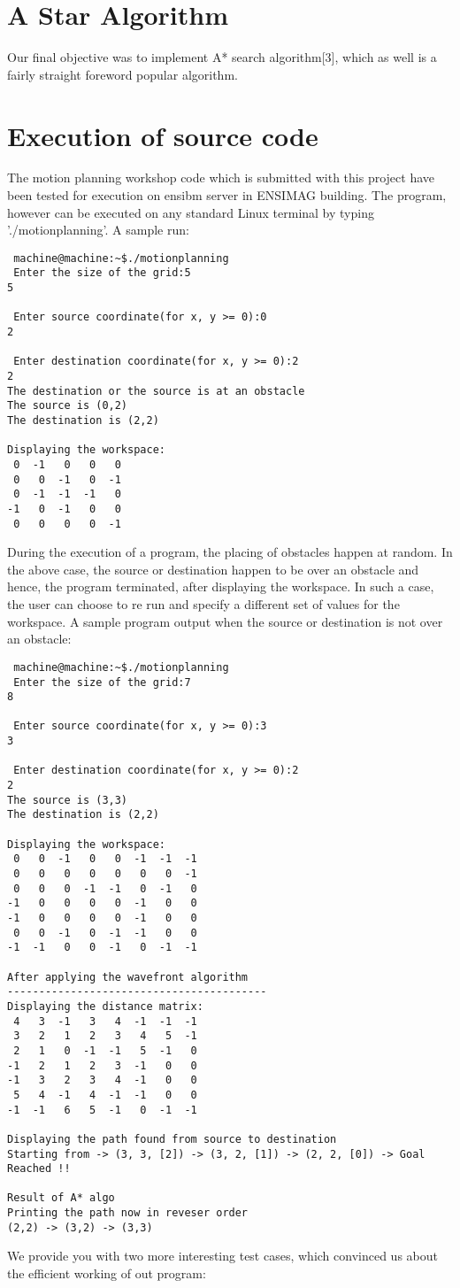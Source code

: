 \documentclass{report}
\begin{document}
\section{A Star Algorithm}
	Our final objective was to implement A* search algorithm[3], which as well is a fairly straight foreword popular algorithm.
	
\section{Execution of source code}

	The motion planning workshop code which is submitted with this project have been tested for execution on \textsf{ensibm} server in ENSIMAG building. The program, however can be executed on any standard Linux terminal by typing \textsf{'./motionplanning'}. A sample run:
	\begin{verbatim}
 machine@machine:~$./motionplanning
 Enter the size of the grid:5
5

 Enter source coordinate(for x, y >= 0):0
2

 Enter destination coordinate(for x, y >= 0):2
2
The destination or the source is at an obstacle
The source is (0,2) 
The destination is (2,2) 

Displaying the workspace:
 0	-1	 0	 0	 0	
 0	 0	-1	 0	-1	
 0	-1	-1	-1	 0	
-1	 0	-1	 0	 0	
 0	 0	 0	 0	-1	
	\end{verbatim}
	During the execution of a program, the placing of obstacles happen at random. In the above case, the source or destination happen to be over an obstacle and hence, the program terminated, after displaying the workspace. In such a case, the user can choose to re run and specify a different set of values for the \textsf{workspace}. A sample program output when the source or destination is not over an obstacle:
	
	\begin{verbatim}
 machine@machine:~$./motionplanning
 Enter the size of the grid:7
8

 Enter source coordinate(for x, y >= 0):3
3

 Enter destination coordinate(for x, y >= 0):2
2
The source is (3,3) 
The destination is (2,2) 

Displaying the workspace:
 0	 0	-1	 0	 0	-1	-1	-1	
 0	 0	 0	 0	 0	 0	 0	-1	
 0	 0	 0	-1	-1	 0	-1	 0	
-1	 0	 0	 0	 0	-1	 0	 0	
-1	 0	 0	 0	 0	-1	 0	 0	
 0	 0	-1	 0	-1	-1	 0	 0	
-1	-1	 0	 0	-1	 0	-1	-1	

After applying the wavefront algorithm
-----------------------------------------
Displaying the distance matrix:
 4	 3	-1	 3	 4	-1	-1	-1	
 3	 2	 1	 2	 3	 4	 5	-1	
 2	 1	 0	-1	-1	 5	-1	 0	
-1	 2	 1	 2	 3	-1	 0	 0	
-1	 3	 2	 3	 4	-1	 0	 0	
 5	 4	-1	 4	-1	-1	 0	 0	
-1	-1	 6	 5	-1	 0	-1	-1	

Displaying the path found from source to destination 
Starting from -> (3, 3, [2]) -> (3, 2, [1]) -> (2, 2, [0]) -> Goal Reached !!

Result of A* algo
Printing the path now in reveser order
(2,2) -> (3,2) -> (3,3)
	\end{verbatim}
	We provide you with two more \textsf{interesting} test cases, which convinced us about the efficient working of out program:
	
\end{document}
